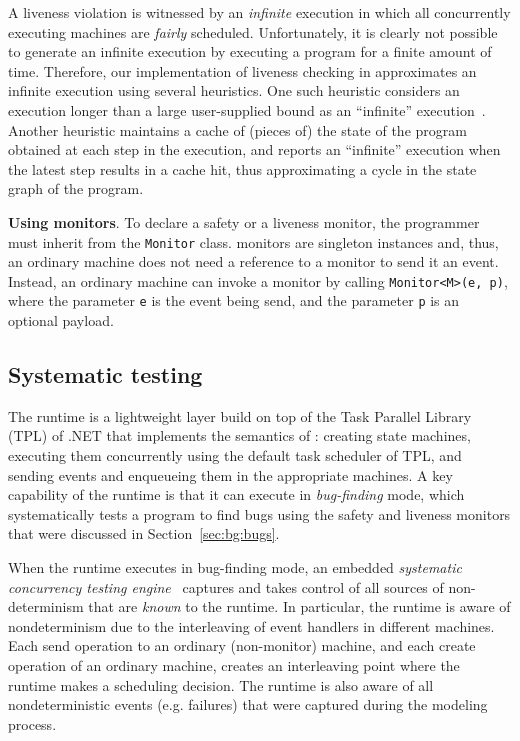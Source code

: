 A liveness violation is witnessed by an \emph{infinite} execution in which all concurrently executing \psharp machines are \emph{fairly} scheduled. Unfortunately, it is clearly not possible to generate an infinite execution by executing a program for a finite amount of time. Therefore, our implementation of liveness checking in \psharp approximates an infinite execution using several heuristics. One such heuristic considers an execution longer than a large user-supplied bound as an ``infinite'' execution~\cite{killian2007life, musuvathi2008fair}. Another heuristic maintains a cache of (pieces of) the state of the \psharp program obtained at each step in the execution, and reports an ``infinite'' execution when the latest step results in a cache hit, thus approximating a cycle in the state graph of the program.

\textbf{Using monitors}.
To declare a safety or a liveness monitor, the programmer must inherit from the \psharp \texttt{Monitor} class. \psharp monitors are singleton instances and, thus, an ordinary machine does not need a reference to a monitor to send it an event. Instead, an ordinary machine can invoke a monitor by calling \texttt{Monitor<M>(e, p)}, where the parameter \texttt{e} is the event being send, and the parameter \texttt{p} is an optional payload.

\subsection{Systematic testing}
\label{sec:psharp:testing}

The \psharp runtime is a lightweight layer build on top of the Task Parallel Library (TPL) of .NET that implements the semantics of \psharp: creating state machines, executing them concurrently using the default task scheduler of TPL, and sending events and enqueueing them in the appropriate machines. A key capability of the \psharp runtime is that it can execute in \emph{bug-finding} mode, which systematically tests a \psharp program to find bugs using the safety and liveness monitors that were discussed in Section~\ref{sec:bg:bugs}.

When the \psharp runtime executes in bug-finding mode, an embedded \emph{systematic concurrency testing engine}~\cite{godefroid1997verisoft, musuvathi2008finding, emmi2011delay} captures and takes control of all sources of non-determinism that are \emph{known} to the \psharp runtime. In particular, the runtime is aware of nondeterminism due to the interleaving of event handlers in different machines. Each send operation to an ordinary (non-monitor) machine, and each create operation of an ordinary machine, creates an interleaving point where the runtime makes a scheduling decision. The runtime is also aware of all nondeterministic events (e.g. failures) that were captured during the modeling process.

